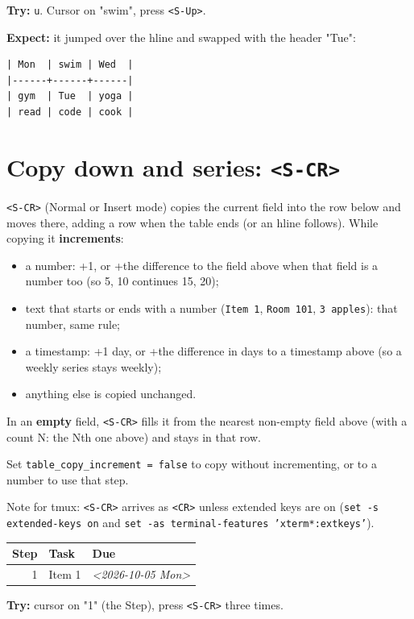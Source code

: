 \textbf{Try:} \texttt{u}. Cursor on "swim", press \texttt{<S-Up>}.

\textbf{Expect:} it jumped over the hline and swapped with the header "Tue":
\begin{verbatim}
| Mon  | swim | Wed  |
|------+------+------|
| gym  | Tue  | yoga |
| read | code | cook |
\end{verbatim}
\section{Copy down and series: \texttt{<S-CR>}}
\label{sec:org3c0e124}
\texttt{<S-CR>} (Normal or Insert mode) copies the current field into the row
below and moves there, adding a row when the table ends (or an hline
follows). While copying it \textbf{increments}:

\begin{itemize}
\item a number: +1, or +the difference to the field above when that field is a
number too (so 5, 10 continues 15, 20);
\item text that starts or ends with a number (\texttt{Item 1}, \texttt{Room 101},
\texttt{3 apples}): that number, same rule;
\item a timestamp: +1 day, or +the difference in days to a timestamp above
(so a weekly series stays weekly);
\item anything else is copied unchanged.
\end{itemize}

In an \textbf{empty} field, \texttt{<S-CR>} fills it from the nearest non-empty field
above (with a count N: the Nth one above) and stays in that row.

Set \texttt{table\_copy\_increment = false} to copy without incrementing, or to a
number to use that step.

Note for tmux: \texttt{<S-CR>} arrives as \texttt{<CR>} unless extended keys are on
(\texttt{set -s extended-keys on} and \texttt{set -as terminal-features 'xterm*:extkeys'}).

\begin{table}[htbp]
\label{tab:org925a93b}
\centering
\begin{tabular}{rll}
Step & Task & Due\\
\hline
1 & Item 1 & \textit{<2026-10-05 Mon>}\\
\end{tabular}
\end{table}

\textbf{Try:} cursor on "1" (the Step), press \texttt{<S-CR>} three times.

